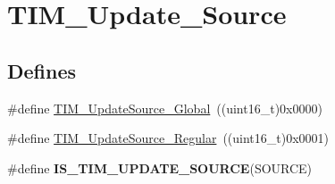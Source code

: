 \hypertarget{group__TIM__Update__Source}{
\section{TIM\_\-Update\_\-Source}
\label{group__TIM__Update__Source}
}
\subsection*{Defines}
\begin{DoxyCompactItemize}
\item 
\#define \hyperlink{group__TIM__Update__Source_ga32c67bc3f8211a2c7b44ee9fe1523875}{TIM\_\-UpdateSource\_\-Global}~((uint16\_\-t)0x0000)
\item 
\#define \hyperlink{group__TIM__Update__Source_ga6f50423cdb011137ae8cd303ccd2080c}{TIM\_\-UpdateSource\_\-Regular}~((uint16\_\-t)0x0001)
\item 
\#define {\bfseries IS\_\-TIM\_\-UPDATE\_\-SOURCE}(SOURCE)
\end{DoxyCompactItemize}


